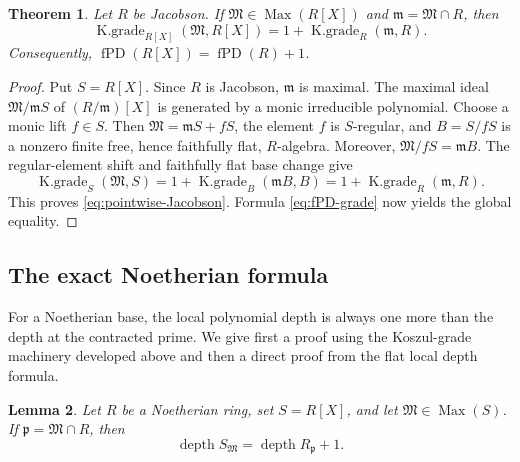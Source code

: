 \documentclass[11pt]{amsart}
\numberwithin{equation}{section}
\newtheorem{theorem}{Theorem}[section]
\newtheorem{lemma}[theorem]{Lemma}
\theoremstyle{definition}
\theoremstyle{remark}
\newcommand{\fPD}{\operatorname{fPD}}
\newcommand{\Max}{\operatorname{Max}}
\newcommand{\depth}{\operatorname{depth}}
\newcommand{\Kgr}{\operatorname{K.grade}}
\begin{document}
\begin{theorem}\label{thm:polynomial-Jacobson}  \cite[Theorem 4.2]{ZhangII}
Let $R$ be Jacobson.  If $\mathfrak M\in\Max(R[X])$ and $\mathfrak m=\mathfrak M\cap R$, then
\begin{equation}\label{eq:pointwise-Jacobson}
 \Kgr_{R[X]}(\mathfrak M,R[X])
 =1+\Kgr_R(\mathfrak m,R).
\end{equation}
Consequently, $\fPD(R[X])=\fPD(R)+1$.
\end{theorem}

\begin{proof}
Put $S=R[X]$.  Since $R$ is Jacobson, $\mathfrak m$ is maximal.  The maximal ideal $\mathfrak M/\mathfrak mS$ of $(R/\mathfrak m)[X]$ is generated by a monic irreducible polynomial.  Choose a monic lift $f\in S$.  Then $\mathfrak M=\mathfrak mS+fS$, the element $f$ is $S$-regular, and $B=S/fS$ is a nonzero finite free, hence faithfully flat, $R$-algebra.  Moreover, $\mathfrak M/fS=\mathfrak mB$.  The regular-element shift and faithfully flat base change give
\[
 \Kgr_S(\mathfrak M,S)
 =1+\Kgr_B(\mathfrak mB,B)
 =1+\Kgr_R(\mathfrak m,R).
\]
This proves \eqref{eq:pointwise-Jacobson}.  Formula \eqref{eq:fPD-grade} now yields the global equality.
\end{proof}

\subsection{The exact Noetherian formula}

For a Noetherian base, the local polynomial depth is always one more
than the depth at the contracted prime.  We give first a proof using the
Koszul-grade machinery developed above and then a direct proof from the
flat local depth formula.

\begin{lemma}\label{lem:depth-poly-local}
Let $R$ be a Noetherian ring, set $S=R[X]$, and let
$\mathfrak M\in\Max(S)$.  If $\mathfrak p=\mathfrak M\cap R$, then
\begin{equation}\label{eq:depth-poly-local}
 \depth S_{\mathfrak M}=\depth R_{\mathfrak p}+1.
\end{equation}
\end{lemma}
\end{document}
